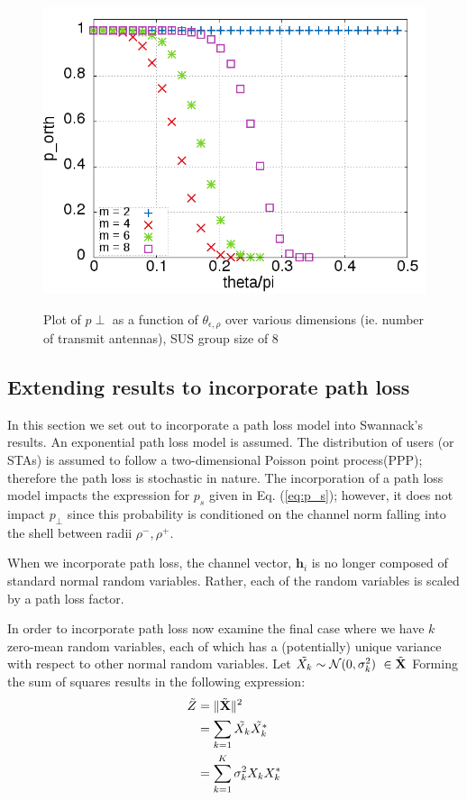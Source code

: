 \begin{figure}
    \includegraphics[width=12cm]{figs/p_orth_gs_8.png}\\
    \caption{Plot of $p{\perp}$ as a function of $\theta_{\epsilon,\rho}$ over various dimensions (ie. number of transmit antennas), SUS group size of 8}
    \label{fig:p_orth_gs_8}
\end{figure}
\newpage
\subsection{Extending results to incorporate path loss}
In this section we set out to incorporate a path loss model into Swannack's results. An exponential path loss model is assumed. The distribution of users (or STAs) is assumed to follow a two-dimensional Poisson point process(PPP); therefore the path loss is stochastic in nature. The incorporation of a path loss model impacts the expression for $p_s$ given in Eq. (\ref{eq:p_s}); however, it does not impact $p_\perp$ since this probability is conditioned on the channel norm falling into the shell between radii $\rho^-,\rho^+$.

When we incorporate path loss, the channel vector, $\textbf{h}_i$ is no longer composed of standard normal random variables. Rather, each of the random variables is scaled by a path loss factor.

In order to incorporate path loss  now examine the final case where we have $k$ zero-mean random variables, each of which has a (potentially) unique variance with respect to other normal random variables. Let $\Tilde{X_k}\sim\mathcal{N}(0,\sigma_k^2)\ \in \Tilde{\textbf{X}}$ Forming the sum of squares results in the following expression:
\begin{equation}\label{eq:gamma_sum_indep_scaled}
    \begin{aligned}
        \Tilde{Z} &= \Vert \Tilde{\textbf{X}} \Vert^2 \\
        &= \sum_{k = 1}\Tilde{X_k}\Tilde{X_k^*}\\
        &= \sum_{k = 1}^K \sigma_k^2X_kX_k^*
    \end{aligned}
\end{equation}


